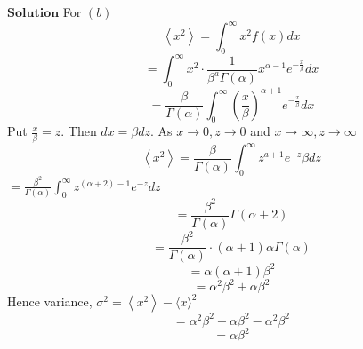 \documentclass{article}
\begin{document}
\begin{flushleft}
$\boxed{\textbf{Solution}}$ For $(b)$ 
$$
\left\langle x^{2}\right\rangle=\int_{0}^{\infty} x^{2} f(x) d x
$$
$$=\int_{0}^{\infty} x^{2} \cdot \frac{1}{\beta^{a} \Gamma(\alpha)} x^{\alpha-1} e^{-\frac{x}{\beta}} d x$$
$$=\frac{\beta}{\Gamma(\alpha)} \int_{0}^{\infty}\left(\frac{x}{\beta}\right)^{\alpha+1} e^{-\frac{x}{\beta}} d x$$
Put $\frac{x}{\beta}=z .$ Then $d x=\beta d z .$ As $x \rightarrow 0, z \rightarrow 0$ and $x \rightarrow \infty, z \rightarrow \infty$
$$
\left\langle x^{2}\right\rangle=\frac{\beta}{\Gamma(\alpha)} \int_{0}^{\infty} z^{a+1} e^{-z} \beta d z
$$
$=\frac{\beta^{2}}{\Gamma(\alpha)} \int_{0}^{\infty} z^{(\alpha+2)-1} e^{-z} d z$
$$=\frac{\beta^{2}}{\Gamma(\alpha)} \Gamma(\alpha+2)$$
$$=\frac{\beta^{2}}{\Gamma(\alpha)} \cdot(\alpha+1) \alpha \Gamma(\alpha)$$
$$=\alpha(\alpha+1) \beta^{2}$$
$$=\alpha^{2} \beta^{2}+\alpha \beta^{2}$$
Hence variance, $\sigma^{2}=\left\langle x^{2}\right\rangle-\langle x\rangle^{2}$
$$=\alpha^{2} \beta^{2}+\alpha \beta^{2}-\alpha^{2} \beta^{2}$$
$$=\alpha \beta^{2}$$



\end{flushleft}
\end{document}

